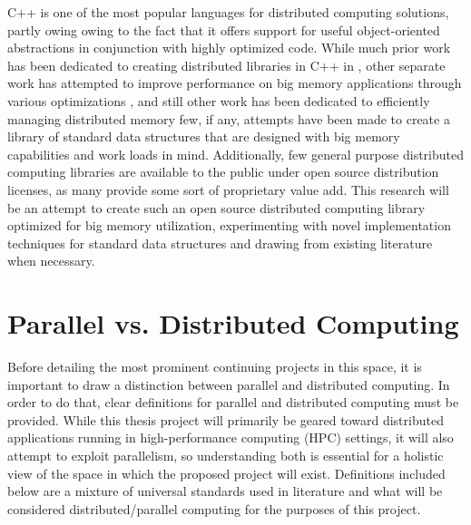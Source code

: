 C++ is one of the most popular languages for distributed computing solutions, partly owing owing to the fact that it offers support for useful object-oriented abstractions in conjunction with highly optimized code. \cite{towards_dist_cpp} While much prior work has been dedicated to creating distributed libraries in C++ in \cite{STAPL}  \cite{practical_dist_c}
\cite{taskflow} \cite{intel_tbb} \cite{parallel_programming_w_charm} \cite{chapel} \cite{X10}, other separate work has attempted to improve performance on big memory applications through various optimizations \cite{virtual_memory_tlb}, and still other work has been dedicated to efficiently managing distributed memory \cite{spark} \cite{zookeeper} \cite{memcached} \cite{GAM}  few, if any, attempts have been made to create a library of standard data structures that are designed with big memory capabilities and work loads in mind. Additionally, few general purpose distributed computing libraries are available to the public under open source distribution licenses, as many provide some sort of proprietary value add. This research will be an attempt to create such an open source distributed computing library optimized for big memory utilization, experimenting with novel implementation techniques for standard data structures and drawing from existing literature when necessary. 
\section{Parallel vs. Distributed Computing}
Before detailing the most prominent continuing projects in this space, it is important to draw a distinction between parallel and distributed computing. In order to do that, clear definitions for parallel and distributed computing must be provided. While this thesis project will primarily be geared toward distributed applications running in high-performance computing (HPC) settings, it will also attempt to exploit parallelism, so understanding both is essential for a holistic view of the space in which the proposed project will exist. Definitions included below are a mixture of universal standards used in literature and what will be considered distributed/parallel computing for the purposes of this project.

